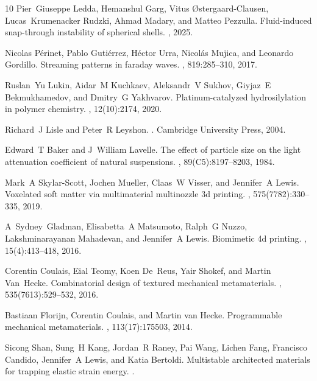 \documentclass[twocolumn,letter,11pt]{article}
\begin{document}
\begin{thebibliography}{10}
Pier~Giuseppe Ledda, Hemanshul Garg, Vitus {\O}stergaard-Clausen,
  Lucas~Krumenacker Rudzki, Ahmad Madary, and Matteo Pezzulla.
\newblock Fluid-induced snap-through instability of spherical shells.
, 2025.

Nicolas P{\'e}rinet, Pablo Guti{\'e}rrez, H{\'e}ctor Urra, Nicol{\'a}s Mujica,
  and Leonardo Gordillo.
\newblock Streaming patterns in faraday waves.
, 819:285--310, 2017.

Ruslan~Yu Lukin, Aidar~M Kuchkaev, Aleksandr~V Sukhov, Giyjaz~E Bekmukhamedov,
  and Dmitry~G Yakhvarov.
\newblock Platinum-catalyzed hydrosilylation in polymer chemistry.
, 12(10):2174, 2020.

Richard~J Lisle and Peter~R Leyshon.
.
\newblock Cambridge University Press, 2004.

Edward~T Baker and J~William Lavelle.
\newblock The effect of particle size on the light attenuation coefficient of
  natural suspensions.
, 89(C5):8197--8203,
  1984.

Mark~A Skylar-Scott, Jochen Mueller, Claas~W Visser, and Jennifer~A Lewis.
\newblock Voxelated soft matter via multimaterial multinozzle 3d printing.
, 575(7782):330--335, 2019.

A~Sydney~Gladman, Elisabetta~A Matsumoto, Ralph~G Nuzzo, Lakshminarayanan
  Mahadevan, and Jennifer~A Lewis.
\newblock Biomimetic 4d printing.
, 15(4):413--418, 2016.

Corentin Coulais, Eial Teomy, Koen De~Reus, Yair Shokef, and Martin Van~Hecke.
\newblock Combinatorial design of textured mechanical metamaterials.
, 535(7613):529--532, 2016.

Bastiaan Florijn, Corentin Coulais, and Martin van Hecke.
\newblock Programmable mechanical metamaterials.
, 113(17):175503, 2014.

Sicong Shan, Sung~H Kang, Jordan~R Raney, Pai Wang, Lichen Fang, Francisco
  Candido, Jennifer~A Lewis, and Katia Bertoldi.
\newblock Multistable architected materials for trapping elastic strain energy.
.


\end{thebibliography}
\end{document}
